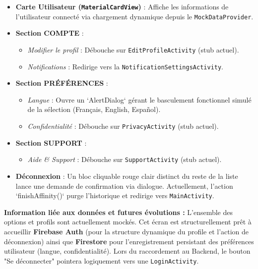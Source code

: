 \documentclass{article}
\begin{document}
\begin{itemize}
    \item \textbf{Carte Utilisateur (\texttt{MaterialCardView})} : Affiche les informations de l'utilisateur connecté via chargement dynamique depuis le \texttt{MockDataProvider}.
    \item \textbf{Section COMPTE} :
    \begin{itemize}
        \item \textit{Modifier le profil} : Débouche sur \texttt{EditProfileActivity} (stub actuel).
        \item \textit{Notifications} : Redirige vers la \texttt{NotificationSettingsActivity}.
    \end{itemize}
    \item \textbf{Section PRÉFÉRENCES} :
    \begin{itemize}
        \item \textit{Langue} : Ouvre un `AlertDialog` gérant le basculement fonctionnel simulé de la sélection (Français, English, Español).
        \item \textit{Confidentialité} : Débouche sur \texttt{PrivacyActivity} (stub actuel).
    \end{itemize}
    \item \textbf{Section SUPPORT} :
    \begin{itemize}
        \item \textit{Aide \& Support} : Débouche sur \texttt{SupportActivity} (stub actuel).
    \end{itemize}
    \item \textbf{Déconnexion} : Un bloc cliquable rouge clair distinct du reste de la liste lance une demande de confirmation via dialogue. Actuellement, l'action `finishAffinity()` purge l'historique et redirige vers \texttt{MainActivity}.
\end{itemize}

\textbf{Information liée aux données et futures évolutions :} 
L'ensemble des options et profils sont actuellement mockés. Cet écran est structurellement prêt à accueillir \textbf{Firebase Auth} (pour la structure dynamique du profile et l'action de déconnexion) ainsi que \textbf{Firestore} pour l'enregistrement persistant des préférences utilisateur (langue, confidentialité). Lors du raccordement au Backend, le bouton "Se déconnecter" pointera logiquement vers une \texttt{LoginActivity}.
\end{document}
